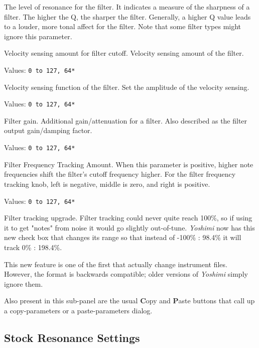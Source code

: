    The level of resonance for the filter.
   It indicates a measure of the sharpness of a filter.
   The higher the Q, the sharper the filter.
   Generally, a higher Q value leads to a louder, more tonal
   affect for the filter.
   Note that some filter types might ignore this parameter.

   Velocity sensing amount for filter cutoff.
   Velocity sensing amount of the filter.

   Values: \texttt{0 to 127, 64*}

   Velocity sensing function of the filter.
   Set the amplitude of the velocity sensing.

   Values: \texttt{0 to 127, 64*}

   Filter gain.
   Additional gain/attenuation for a filter.
   Also described as the filter output gain/damping factor.

   Values: \texttt{0 to 127, 64*}

   Filter Frequency Tracking Amount.
   When this parameter is positive, higher note
   frequencies shift the filter’s cutoff frequency higher.
   For the filter frequency tracking knob, left is negative, middle is
   zero, and right is positive.

   Values: \texttt{0 to 127, 64*}

   Filter tracking upgrade.
   Filter tracking could never quite reach 100\%,
   so if using it to get "notes" from noise it would go slightly out-of-tune.
   \textsl{Yoshimi} now has this new check box that changes its range so that
   instead of -100\% : 98.4\% it will track 0\% : 198.4\%.

   This new feature is one of the first that actually change instrument files.
   However, the format is backwards compatible; older versions of
   \textsl{Yoshimi} simply ignore them.

   Also present in this sub-panel are the usual \textbf{C}opy
   and \textbf{P}aste buttons that call up a copy-parameters or
   a paste-parameters dialog.

\subsection{Stock Resonance Settings}
\label{subsec:stock_resonance_settings}

